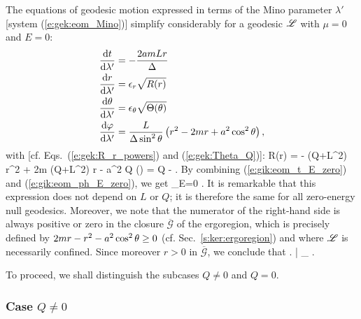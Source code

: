 The equations of geodesic motion expressed in terms of the Mino parameter $\lambda'$
[system (\ref{e:gek:eom_Mino})] simplify considerably for a geodesic $\mathscr{L}$ with $\mu=0$ and $E=0$:
\begin{subequations}
\begin{align}
&  \frac{\mathrm{d} t}{\mathrm{d} \lambda'} = - \frac{2 a m L r}{\Delta} \label{e:gik:eom_t_E_zero} \\
&  \frac{\mathrm{d} r}{\mathrm{d} \lambda'} = \epsilon_r \sqrt{ R(r) }  \label{e:gik:eom_r_E_zero}\\
&  \frac{\mathrm{d} \theta}{\mathrm{d} \lambda'} = \epsilon_\theta \sqrt{\Theta(\theta)}  \\
&  \frac{\mathrm{d} \varphi}{\mathrm{d} \lambda'}  = \frac{L}{\Delta\sin^2\theta} \left( r^2 - 2 m r + a^2\cos^2\theta \right) ,
                                \label{e:gik:eom_ph_E_zero}
\end{align}
\end{subequations}
with [cf. Eqs.~(\ref{e:gek:R_r_powers}) and (\ref{e:gek:Theta_Q})]:
\be \label{e:gik:R_E_zero}
    R(r) = - (Q+L^2) r^2 + 2m (Q+L^2) r - a^2 Q
\ee
\be \label{e:gik:Theta_E_zero}
    \Theta(\th) = Q -  .
\ee
By combining (\ref{e:gik:eom_t_E_zero}) and (\ref{e:gik:eom_ph_E_zero}), we get
\be
    _{E=0} .
\ee
It is remarkable that this expression does not depend on $L$ or $Q$; it is therefore the
same for all zero-energy null geodesics. Moreover, we note that the numerator
of the right-hand side is always positive or zero in the closure $\overline{\mathscr{G}}$ of the ergoregion,
which is precisely defined by $2mr - r^2 - a^2\cos^2\theta \geq 0$ (cf. Sec.~\ref{s:ker:ergoregion})
and where $\mathscr{L}$ is necessarily confined. Since moreover $r > 0$ in $\overline{\mathscr{G}}$,
we conclude that
\be
    \left.  \right| _{\Li}  .
\ee


To proceed, we shall distinguish the subcases $Q\neq 0$ and $Q=0$.

\subsubsection{Case $Q\neq 0$}

